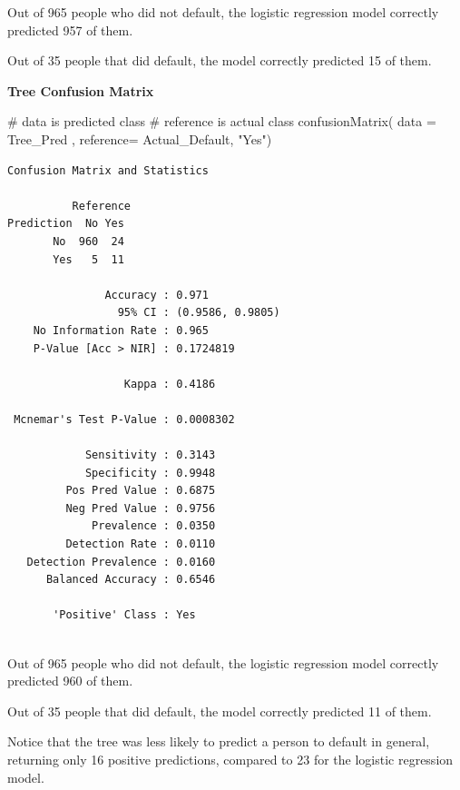 \documentclass[
  letterpaper,
  DIV=11,
  numbers=noendperiod]{scrreprt}
\newenvironment{Shaded}{\begin{snugshade}}{\end{snugshade}}
\newcommand{\AttributeTok}[1]{\textcolor[rgb]{0.40,0.45,0.13}{#1}}
\newcommand{\CommentTok}[1]{\textcolor[rgb]{0.37,0.37,0.37}{#1}}
\newcommand{\FunctionTok}[1]{\textcolor[rgb]{0.28,0.35,0.67}{#1}}
\newcommand{\NormalTok}[1]{\textcolor[rgb]{0.00,0.23,0.31}{#1}}
\newcommand{\StringTok}[1]{\textcolor[rgb]{0.13,0.47,0.30}{#1}}
\begin{document}
Out of 965 people who did not default, the logistic regression model
correctly predicted 957 of them.

Out of 35 people that did default, the model correctly predicted 15 of
them.

\textbf{Tree Confusion Matrix}

\begin{Shaded}
\begin{Highlighting}[]
\CommentTok{\# data is predicted class}
\CommentTok{\# reference is actual class}
\FunctionTok{confusionMatrix}\NormalTok{( }\AttributeTok{data =}\NormalTok{ Tree\_Pred , }\AttributeTok{reference=}\NormalTok{ Actual\_Default, }\StringTok{"Yes"}\NormalTok{)}
\end{Highlighting}
\end{Shaded}

\begin{verbatim}
Confusion Matrix and Statistics

          Reference
Prediction  No Yes
       No  960  24
       Yes   5  11
                                          
               Accuracy : 0.971           
                 95% CI : (0.9586, 0.9805)
    No Information Rate : 0.965           
    P-Value [Acc > NIR] : 0.1724819       
                                          
                  Kappa : 0.4186          
                                          
 Mcnemar's Test P-Value : 0.0008302       
                                          
            Sensitivity : 0.3143          
            Specificity : 0.9948          
         Pos Pred Value : 0.6875          
         Neg Pred Value : 0.9756          
             Prevalence : 0.0350          
         Detection Rate : 0.0110          
   Detection Prevalence : 0.0160          
      Balanced Accuracy : 0.6546          
                                          
       'Positive' Class : Yes             
                                          
\end{verbatim}

Out of 965 people who did not default, the logistic regression model
correctly predicted 960 of them.

Out of 35 people that did default, the model correctly predicted 11 of
them.

Notice that the tree was less likely to predict a person to default in
general, returning only 16 positive predictions, compared to 23 for the
logistic regression model.
\end{document}
